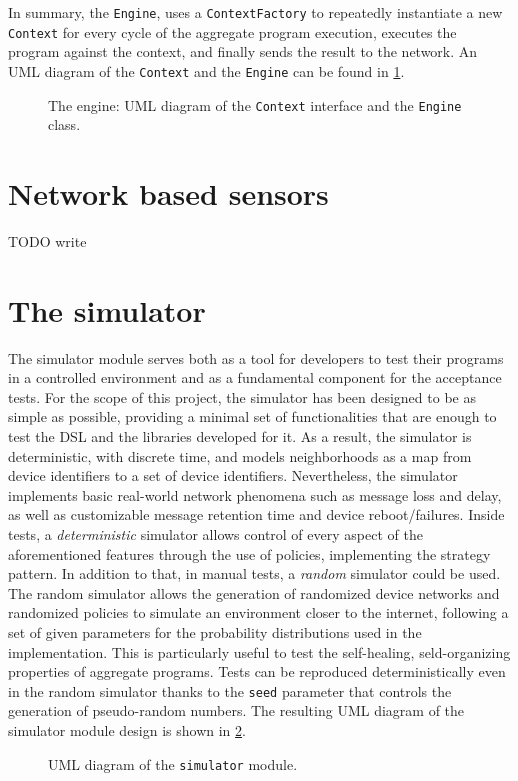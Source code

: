 In summary, the \texttt{Engine}, uses a \texttt{ContextFactory} to repeatedly instantiate a new \texttt{Context} for every cycle of the aggregate program execution, executes the program against the context, and finally sends the result to the network.
%
An \ac{UML} diagram of the \texttt{Context} and the \texttt{Engine} can be found in \cref{fig:engine-diagram}.

\begin{figure}
    \centering
    \caption{The engine: \ac{UML} diagram of the \texttt{Context} interface and the \texttt{Engine} class.}
    \label{fig:engine-diagram}
    \bigskip
    \resizebox{\linewidth}{!}{
        
    }
\end{figure}


\section{Network based sensors}

TODO write


\section{The simulator}

The simulator module serves both as a tool for developers to test their programs in a controlled environment and as a fundamental component for the acceptance tests.
%
For the scope of this project, the simulator has been designed to be as simple as possible, providing a minimal set of functionalities that are enough to test the \ac{DSL} and the libraries developed for it.
%
As a result, the simulator is deterministic, with discrete time, and models neighborhoods as a map from device identifiers to a set of device identifiers.
%
Nevertheless, the simulator implements basic real-world network phenomena such as message loss and delay, as well as customizable message retention time and device reboot/failures.
%
Inside tests, a \textit{deterministic} simulator allows control of every aspect of the aforementioned features through the use of policies, implementing the strategy pattern.
%
In addition to that, in manual tests, a \textit{random} simulator could be used.
%
The random simulator allows the generation of randomized device networks and randomized policies to simulate an environment closer to the internet, following a set of given parameters for the probability distributions used in the implementation.
%
This is particularly useful to test the self-healing, seld-organizing properties of aggregate programs.
%
Tests can be reproduced deterministically even in the random simulator thanks to the \texttt{seed} parameter that controls the generation of pseudo-random numbers.
%
The resulting \ac{UML} diagram of the simulator module design is shown in \cref{fig:simulator-uml}.

\begin{figure}
    \centering
    \caption{\ac{UML} diagram of the \texttt{simulator} module.}
    \label{fig:simulator-uml}
    \bigskip
    \resizebox{\linewidth}{!}{
        
    }
\end{figure}
